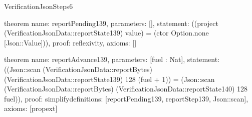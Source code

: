 \begin{lexlean}{VerificationJsonSteps6}
\begin{semanticmodule}
theorem{
  name: reportPending139,
  parameters: [],
  statement: ((project (VerificationJsonData::reportState139) value) = (ctor Option.none [Json::Value])),
  proof: reflexivity{},
  axioms: []
}

theorem{
  name: reportAdvance139,
  parameters: [fuel : Nat],
  statement: ((Json::scan (VerificationJsonData::reportBytes) (VerificationJsonData::reportState139) 128 (fuel + 1)) = (Json::scan (VerificationJsonData::reportBytes) (VerificationJsonData::reportState140) 128 fuel)),
  proof: simplify{definitions: [reportPending139, reportStep139, Json::scan]},
  axioms: [propext]
}

\end{semanticmodule}
\end{lexlean}
